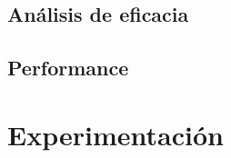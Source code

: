 \documentclass[a4paper, 10pt, twoside]{article}
\begin{document}
\subsection{Análisis de eficacia}
\subsection{Performance}



\newpage

\section{Experimentación}
\end{document}
